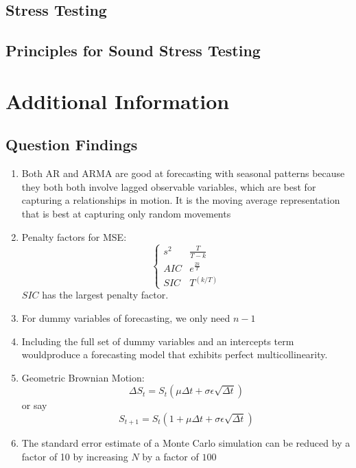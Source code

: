 \documentclass[11pt,fleqn]{book} %
\numberwithin{equation}{section} %
\numberwithin{figure}{section} %
\numberwithin{table}{section} %
\begin{document}
\chapter{Stress Testing}

\chapter{Principles for Sound Stress Testing}
\part{Additional Information}
\chapter{Question Findings}
\begin{enumerate}
    \item Both AR and ARMA are good at forecasting with seasonal patterns because they both
    both involve lagged observable variables, which are best for capturing a relationships
    in motion. It is the moving average representation that is best at capturing only
    random movements
    \item Penalty factors for MSE:
    $$
    \begin{cases}
        s^2&\frac{T}{T-k}\\
        AIC&e^{\frac{2k}{T}}\\
        SIC&T^{(k/T)}
    \end{cases}
    $$
    $SIC$ has the largest penalty factor.
    \item For dummy variables of forecasting, we only need $n-1$
    \item Including the full set of dummy variables and an intercepts term wouldproduce a forecasting
    model that exhibits perfect multicollinearity.
    \item Geometric Brownian Motion: 
    $$
    \Delta S_t=S_t(\mu\Delta t+\sigma\epsilon\sqrt{\Delta t})
    $$
    or say
    $$
    S_{t+1}=S_t(1+\mu\Delta t+\sigma\epsilon\sqrt{\Delta t})
    $$
    \item The standard error estimate of a Monte Carlo simulation can be 
    reduced by a factor of 10 by increasing $N$ by a factor of $100$
    \begin{figure}[h!]
        \centering

\end{figure}
\end{enumerate}
\end{document}
